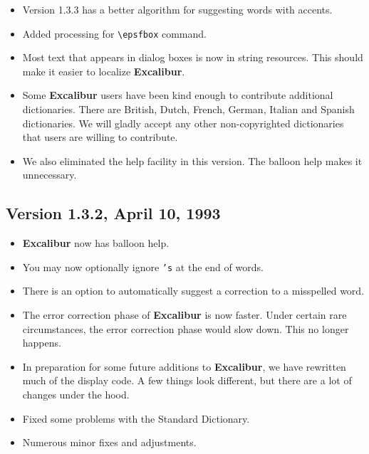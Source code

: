 \documentclass[11pt,titlepage]{article}
\newcommand{\ex}{\textbf{Excalibur}}
\begin{document}
\begin{itemize}

\item Version 1.3.3 has a better algorithm for suggesting words with
  accents.

\item Added processing for \verb+\epsfbox+ command.

\item Most text that appears in dialog boxes is now in string
  resources. This should make it easier to localize \ex.

\item Some \ex{} users have been kind enough to contribute additional
  dictionaries. There are British, Dutch, French, German, Italian and
  Spanish dictionaries.  We will gladly accept any other
  non-copyrighted dictionaries that users are willing to contribute.

\item We also eliminated the help facility in this version. The
  balloon help makes it unnecessary.

\end{itemize}

\subsection{Version 1.3.2, April 10, 1993}

\begin{itemize}
\item \ex{} now has balloon help.

\item You may now optionally ignore \texttt{'s} at the end of words.

\item There is an option to automatically suggest a correction to a
  misspelled word.

\item The error correction phase of \ex{} is now faster. Under certain
  rare circumstances, the error correction phase would slow down. This
  no longer happens.

\item In preparation for some future additions to \ex{}, we have
  rewritten much of the display code. A few things look different, but
  there are a lot of changes under the hood.

\item Fixed some problems with the Standard Dictionary.

\item Numerous minor fixes and adjustments.
\end{itemize}
\end{document}
